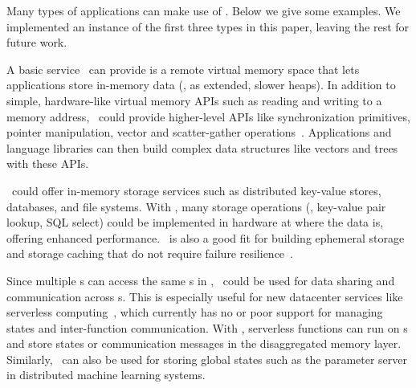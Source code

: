Many types of applications can make use of \phdm.
Below we give some examples. %
We implemented an instance of the first three types in this paper,
leaving the rest for future work.

A basic service \phdm\ can provide is a remote virtual memory space that lets applications
store in-memory data (\eg, as extended, slower heaps).
In addition to simple, hardware-like virtual memory APIs such as reading and writing to a memory address, 
\phdm\ could provide higher-level APIs like synchronization primitives, pointer manipulation, 
vector and scatter-gather operations~\cite{Aguilera-FarMemory}.
Applications and language libraries can then build complex data structures like vectors 
and trees with these APIs.

\phdm\ could offer in-memory storage services such as distributed key-value stores, databases, and file systems.
With \phdm, many storage operations (\eg, key-value pair lookup, SQL select) 
could be implemented in hardware at where the data is, offering enhanced performance. 
\phdm\ is also a good fit for building ephemeral storage and storage caching that do not require failure resilience~\cite{SnowFlake-NSDI20,Pocket,fitzpatrick2004distributed}.

Since multiple \CN{}s can access the same \MN{}s in \phdm,
\phdm\ could be used for data sharing and communication across \CN{}s.
This is especially useful for new datacenter services like serverless computing~\cite{Berkeley-Serverless},
which currently has no or poor support for managing states and inter-function communication.
With \phdm, serverless functions can run on \CN{}s and store states or communication messages in the disaggregated memory layer.
Similarly, \phdm\ can also be used for storing global states such as the parameter server in distributed machine learning systems.

